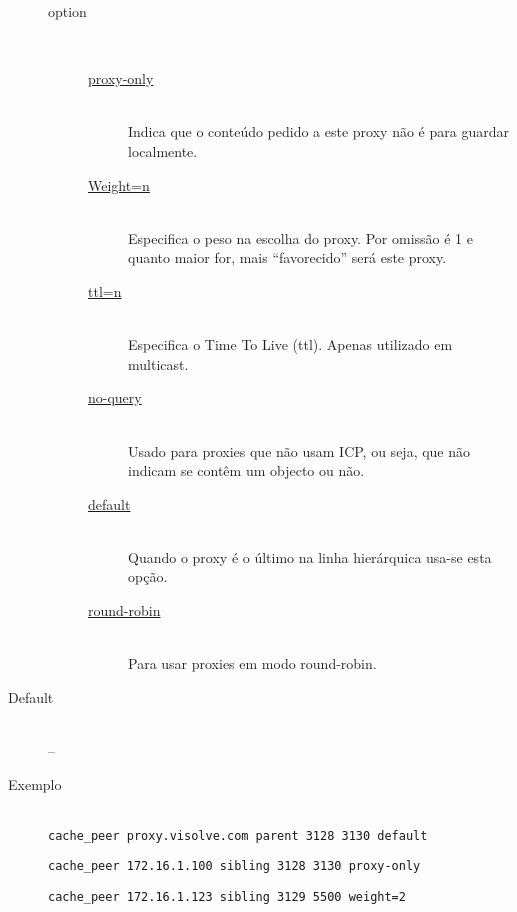 \begin{description}
\begin{description}
\item[option]~\\
\begin{description}
\item[\href{http://squid.visolve.com/squid/squid24s1/glossary.htm\#proxy-only}{proxy-only}]~\\
Indica que o conteúdo pedido a este proxy não é para guardar localmente.

\item[\href{http://squid.visolve.com/squid/squid24s1/glossary.htm\#weight}{Weight=n}]~\\
Especifica o peso na escolha do proxy.
Por omissão é 1 e quanto maior for, mais ``favorecido'' será este proxy.

\item[\href{http://squid.visolve.com/squid/squid24s1/glossary.htm\#ttl}{ttl=n}]~\\
Especifica o Time To Live (ttl). Apenas utilizado em multicast.

\item[\href{http://squid.visolve.com/squid/squid24s1/glossary.htm\#no-query}{no-query}]~\\
Usado para proxies que não usam ICP, ou seja, que não indicam se
contêm um objecto ou não.

\item[\href{http://squid.visolve.com/squid/squid24s1/glossary.htm\#default}{default}]~\\
Quando o proxy é o último na linha hierárquica usa-se esta
opção.

\item[\href{http://squid.visolve.com/squid/squid24s1/glossary.htm\#round-robin}{round-robin}]~\\
Para usar proxies em modo round-robin.
\end{description}
\end{description}

\item[Default]~\\
--

\item[Exemplo]~\\
\texttt{cache\_peer proxy.visolve.com parent 3128 3130 default}

\texttt{cache\_peer 172.16.1.100 sibling 3128 3130 proxy-only}

\texttt{cache\_peer 172.16.1.123 sibling 3129 5500 weight=2}
\end{description}


